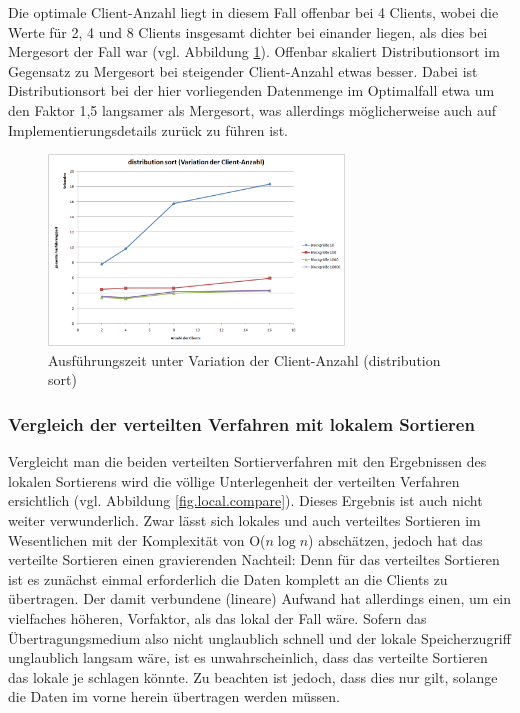 \documentclass[fontsize=12pt,a4paper,headinclude=no,headings=small]{scrartcl}
\begin{document}
Die optimale Client-Anzahl liegt in diesem Fall offenbar bei 4 Clients, wobei die Werte für 2, 4 und 8 Clients insgesamt dichter bei einander liegen, als dies bei Mergesort der Fall war (vgl. Abbildung \ref{fig.ds.compare.clientcount}). Offenbar skaliert Distributionsort im Gegensatz zu Mergesort bei steigender Client-Anzahl etwas besser. Dabei ist Distributionsort bei der hier vorliegenden Datenmenge im Optimalfall etwa um den Faktor 1,5 langsamer als Mergesort, was allerdings möglicherweise auch auf Implementierungsdetails zurück zu führen ist.

\begin{figure}[H]
	\centering
	\includegraphics[width=0.7\textwidth]{results/sort/diagrams/clients_ds.png}
	\caption{Ausführungszeit unter Variation der Client-Anzahl (distribution sort)}
	\label{fig.ds.compare.clientcount}
\end{figure}

\subsubsection{Vergleich der verteilten Verfahren mit lokalem Sortieren}
Vergleicht man die beiden verteilten Sortierverfahren mit den Ergebnissen des lokalen Sortierens wird die völlige Unterlegenheit der verteilten Verfahren ersichtlich (vgl. Abbildung \ref{fig.local.compare}). Dieses Ergebnis ist auch nicht weiter verwunderlich. Zwar lässt sich lokales und auch verteiltes Sortieren im Wesentlichen mit der Komplexität von O($n \log n$) abschätzen, jedoch hat das verteilte Sortieren einen gravierenden Nachteil: Denn für das verteiltes Sortieren ist es zunächst einmal erforderlich die Daten komplett an die Clients zu übertragen. Der damit verbundene (lineare) Aufwand hat allerdings einen, um ein vielfaches höheren, Vorfaktor, als das lokal der Fall wäre. Sofern das Übertragungsmedium also nicht unglaublich schnell und der lokale Speicherzugriff unglaublich langsam wäre, ist es unwahrscheinlich, dass das verteilte Sortieren das lokale je schlagen könnte. Zu beachten ist jedoch, dass dies nur gilt, solange die Daten im vorne herein übertragen werden müssen.
\end{document}
